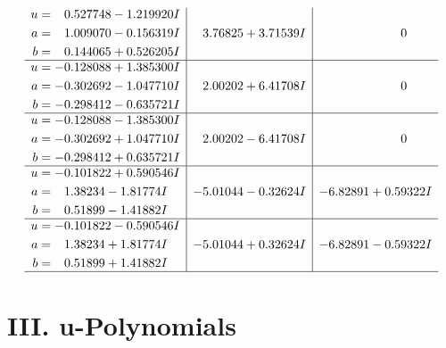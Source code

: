 \documentclass[1p]{elsarticle_modified}
\theoremstyle{definition}
\begin{document}
$$\begin{array}{c|c|c}
\begin{aligned}
u &= \phantom{-}0.527748 - 1.219920 I \\
a &= \phantom{-}1.009070 - 0.156319 I \\
b &= \phantom{-}0.144065 + 0.526205 I\end{aligned}
 & \phantom{-}3.76825 + 3.71539 I & \phantom{-0.000000 } 0 \\ \hline\begin{aligned}
u &= -0.128088 + 1.385300 I \\
a &= -0.302692 - 1.047710 I \\
b &= -0.298412 - 0.635721 I\end{aligned}
 & \phantom{-}2.00202 + 6.41708 I & \phantom{-0.000000 } 0 \\ \hline\begin{aligned}
u &= -0.128088 - 1.385300 I \\
a &= -0.302692 + 1.047710 I \\
b &= -0.298412 + 0.635721 I\end{aligned}
 & \phantom{-}2.00202 - 6.41708 I & \phantom{-0.000000 } 0 \\ \hline\begin{aligned}
u &= -0.101822 + 0.590546 I \\
a &= \phantom{-}1.38234 - 1.81774 I \\
b &= \phantom{-}0.51899 - 1.41882 I\end{aligned}
 & -5.01044 - 0.32624 I & -6.82891 + 0.59322 I \\ \hline\begin{aligned}
u &= -0.101822 - 0.590546 I \\
a &= \phantom{-}1.38234 + 1.81774 I \\
b &= \phantom{-}0.51899 + 1.41882 I\end{aligned}
 & -5.01044 + 0.32624 I & -6.82891 - 0.59322 I\\
 \hline 
 \end{array}$$\newpage
\newpage\renewcommand{\arraystretch}{1}
\centering \section*{ III. u-Polynomials}
\end{document}
